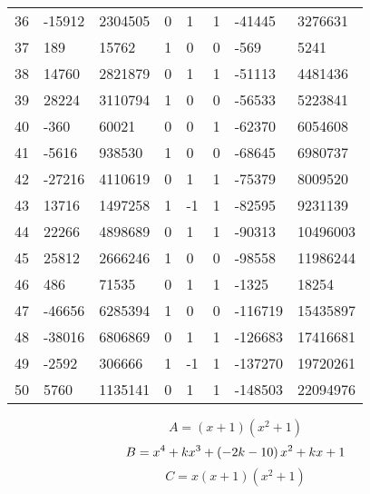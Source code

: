 \documentclass{amsart}
\begin{document}
\begin{longtable}{|l|l|l|lllll|}
36&-15912&2304505&0&1&1&-41445&3276631\\
37&189&15762&1&0&0&-569&5241\\
38&14760&2821879&0&1&1&-51113&4481436\\
39&28224&3110794&1&0&0&-56533&5223841\\
40&-360&60021&0&0&1&-62370&6054608\\
41&-5616&938530&1&0&0&-68645&6980737\\
42&-27216&4110619&0&1&1&-75379&8009520\\
43&13716&1497258&1&-1&1&-82595&9231139\\
44&22266&4898689&0&1&1&-90313&10496003\\
45&25812&2666246&1&0&0&-98558&11986244\\
46&486&71535&0&1&1&-1325&18254\\
47&-46656&6285394&1&0&0&-116719&15435897\\
48&-38016&6806869&0&1&1&-126683&17416681\\
49&-2592&306666&1&-1&1&-137270&19720261\\
50&5760&1135141&0&1&1&-148503&22094976\\
\hline
\end{longtable}
$$A=(x
 + 1)(x^2
 + 1)$$
$$B=x^4
 + k\*x^3
 + \left(-2\*k
 - 10\right) \*x^2
 + k\*x
 + 1$$
$$C=x(x
 + 1)(x^2
 + 1)$$
\end{document}
